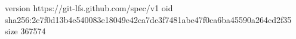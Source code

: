 version https://git-lfs.github.com/spec/v1
oid sha256:2c7f0d13b4e540083e18049e42ca7dc3f7481abe47f0ca6ba45590a264cd2f35
size 367574
